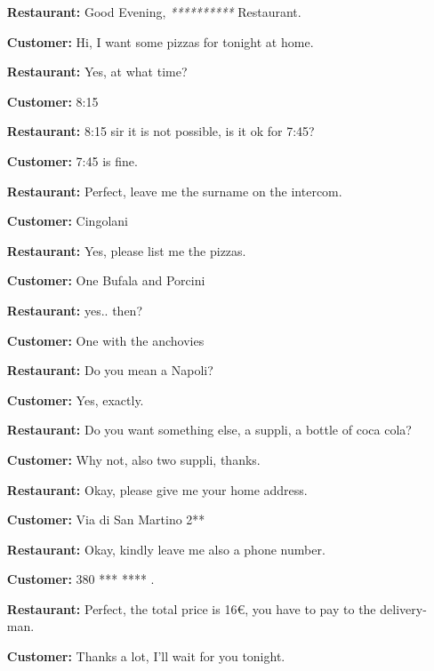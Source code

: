 \begin{itemize}

\item[\textbf{Restaurant:}] Good Evening, \textit{**********} Restaurant.

\item[\textbf{Customer:}] Hi, I want some pizzas for tonight at home.

\item[\textbf{Restaurant:}] Yes, at what time? 

\item[\textbf{Customer:}]  8:15

\item[\textbf{Restaurant:}] 8:15 sir it is not possible, is it ok for 7:45? 

\item[\textbf{Customer:}] 7:45 is fine. 

\item[\textbf{Restaurant:}] Perfect, leave me the surname on the intercom. 

\item[\textbf{Customer:}] Cingolani

\item[\textbf{Restaurant:}] Yes, please list me the pizzas. 

\item[\textbf{Customer:}]  One Bufala and Porcini

\item[\textbf{Restaurant:}] yes.. then?

\item[\textbf{Customer:}]   One with the anchovies 

\item[\textbf{Restaurant:}] Do you mean a Napoli?

\item[\textbf{Customer:}]   Yes, exactly.

\item[\textbf{Restaurant:}] Do you want something else, a suppli, a bottle of coca cola?

\item[\textbf{Customer:}]   Why not, also two suppli, thanks.

\item[\textbf{Restaurant:}] Okay, please give me your home address. 

\item[\textbf{Customer:}]   Via di San Martino 2**

\item[\textbf{Restaurant:}] Okay, kindly leave me also a phone number.

\item[\textbf{Customer:}]   380 *** **** .

\item[\textbf{Restaurant:}] Perfect, the total price is 16€, you have to pay to the delivery-man.

\item[\textbf{Customer:}]   Thanks a lot, I'll wait for you tonight.

\end{itemize}
